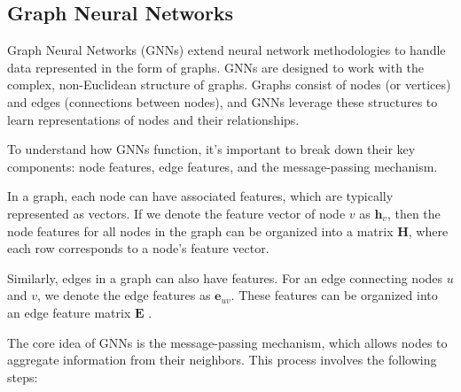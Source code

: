 \subsection{Graph Neural Networks}

Graph Neural Networks (GNNs) extend neural network methodologies to handle data represented in the form of graphs.
GNNs are designed to work with the complex, non-Euclidean structure of graphs.
Graphs consist of nodes (or vertices) and edges (connections between nodes), and GNNs leverage these structures to learn representations of nodes and their relationships\cite{Scarselli_Gori_Tsoi_Hagenbuchner_Monfardini_2009}.

To understand how GNNs function, it's important to break down their key components: node features, edge features, and the message-passing mechanism.

In a graph, each node can have associated features, which are typically represented as vectors.
If we denote the feature vector of node \( v \) as \( \mathbf{h}_v \), then the node features for all nodes in the graph can be organized into a matrix \( \mathbf{H} \), where each row corresponds to a node's feature vector.

Similarly, edges in a graph can also have features.
For an edge connecting nodes \( u \) and \( v \), we denote the edge features as \( \mathbf{e}_{uv} \).
These features can be organized into an edge feature matrix \( \mathbf{E} \) \cite{Wu_Cui_Pei_Zhao_2022}.

The core idea of GNNs is the message-passing mechanism, which allows nodes to aggregate information from their neighbors.
This process involves the following steps:

